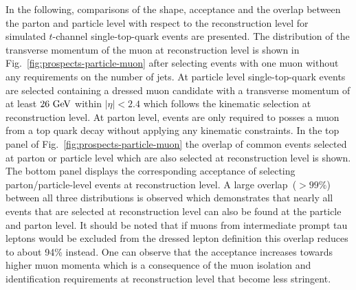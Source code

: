 In the following, comparisons of the shape, acceptance and the overlap between the parton and particle level with respect to the reconstruction level for simulated $t$-channel single-top-quark events are presented. The distribution of the transverse momentum of the muon at reconstruction level is shown in Fig.~\ref{fig:prospects-particle-muon} after selecting events with one muon without any requirements on the number of jets. At particle level single-top-quark events are selected containing a dressed muon candidate with a transverse momentum of at least $26~\textrm{GeV}$ within $|\eta|<2.4$ which follows the kinematic selection at reconstruction level. At parton level, events are only required to posses a muon from a top quark decay without applying any kinematic constraints. In the top panel of Fig.~\ref{fig:prospects-particle-muon} the overlap of common events selected at parton or particle level which are also selected at reconstruction level is shown. The bottom panel displays the corresponding acceptance of selecting parton/particle-level events at reconstruction level. A large overlap~($>99\%$) between all three distributions is observed which demonstrates that nearly all events that are selected at reconstruction level can also be found at the particle and parton level. It should be noted that if muons from intermediate prompt tau leptons would be excluded from the dressed lepton definition this overlap reduces to about 94\% instead. One can observe that the acceptance increases towards higher muon momenta which is a consequence of the muon isolation and identification requirements at reconstruction level that become less stringent. 

